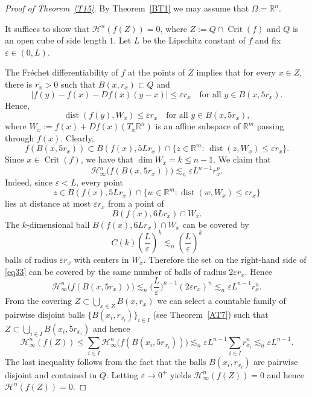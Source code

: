 \documentclass[12pt,leqno]{amsart}
\theoremstyle{definition}
\newcommand{\bbbr}{\mathbb R}
\newcommand{\eps}{\varepsilon}
\def\dist{\operatorname{dist}}
\def\H{{\mathcal H}}
\numberwithin{theorem}{section} \numberwithin{equation}{section}
\begin{document}
\begin{proof}[Proof of Theorem~\ref{T15}]
By Theorem~\ref{BT1} we may assume that $\Omega=\bbbr^n$.

It suffices to show that $\H^n(f(Z))=0$, where $Z:=Q\cap\operatorname{Crit}(f)$ and $Q$ is an open cube of side length $1$. Let $L$ be the Lipschitz constant of $f$ and fix $\eps\in (0,L)$.

The Fr\'echet differentiability of $f$ at the points of $Z$ implies that for every $x\in Z$, there is $r_x>0$ such that $B(x,r_x)\subset Q$ and
$$
|f(y)-f(x)-Df(x)(y-x)|\leq\eps r_x
\quad
\text{for all } y\in B(x,5r_x).
$$
Hence,
$$
\dist (f(y),W_x)\leq\eps r_x
\quad
\text{for all } y\in B(x,5r_x),
$$
where $W_x:=f(x)+Df(x)(T_x\bbbr^n)$ is an affine subspace of $\bbbr^m$ passing through $f(x)$. Clearly,
\begin{equation}
\label{eq33}
f(B(x,5r_x))\subset B(f(x),5Lr_x)\cap\{z\in\bbbr^m:\, \dist (z,W_x)\leq\eps r_x\}.
\end{equation}
Since $x\in\operatorname{Crit}(f)$, we have that $\dim W_x=k\leq n-1$. We claim that
$$
\H^n_\infty\big(f(B(x,5r_x))\big)\lesssim_n \eps L^{n-1}r_x^n.
$$
Indeed,
since $\eps<L$, every point
$$
z\in B(f(x),5Lr_x)
   \cap\{w\in\bbbr^m:\dist(w,W_x)\leq\eps r_x\}
$$
lies at distance at most $\eps r_x$ from a point of
$$
B(f(x),6Lr_x)\cap W_x.
$$
The $k$-dimensional ball $B(f(x),6Lr_x)\cap W_x$ can be covered by
$$
C(k)\left(\frac{L}{\eps}\right)^k
    \lesssim_n \left(\frac{L}{\eps}\right)^k
$$
balls of radius $\eps r_x$ with centers in $W_x$.
Therefore the set on the right-hand side of \eqref{eq33} can be
covered by the same number of balls of radius $2\eps r_x$.
Hence
\begin{equation}
\label{eq35}
\H^n_\infty\big(f(B(x,5r_x))\big)\lesssim_n\Big(\frac{L}{\eps}\Big)^{n-1}(2\eps r_x)^n\lesssim_n\eps L^{n-1}r_x^n.
\end{equation}
From the covering $Z\subset\bigcup_{x\in Z} B(x,r_x)$ we can select a countable family of pairwise disjoint balls $\{B(x_i,r_{x_i})\}_{i\in I}$ (see Theorem~\ref{AT7}) such that $Z\subset\bigcup_{i\in I}B(x_i,5r_{x_i})$ and hence
$$
\H^n_\infty(f(Z))\leq\sum_{i\in I} \H^n_\infty\big(f(B(x_i,5r_{x_i}))\big)\lesssim_n
\eps L^{n-1}\sum_{i\in I} r_{x_i}^n
\lesssim_n\eps L^{n-1}.
$$
The last inequality follows from the fact that the balls $B(x_i,r_{x_i})$ are pairwise disjoint and contained in $Q$.
Letting $\eps\to 0^+$ yields $\H^n_\infty(f(Z))=0$ and hence $\H^n(f(Z))=0$.
\end{proof}
\end{document}
